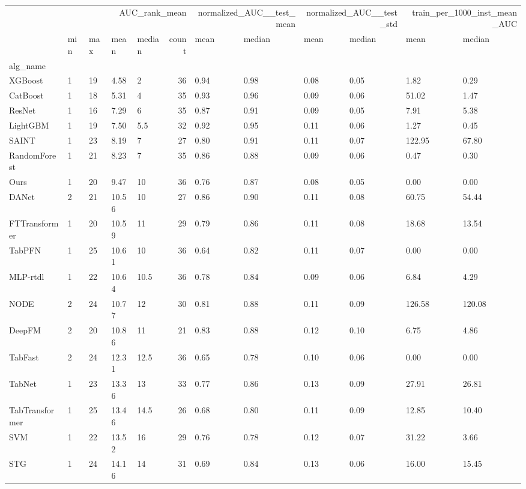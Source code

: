 \begin{tabular}{lllllrllllll}
\toprule
 & \multicolumn{5}{r}{AUC_rank_mean} & \multicolumn{2}{r}{normalized_AUC__test_mean} & \multicolumn{2}{r}{normalized_AUC__test_std} & \multicolumn{2}{r}{train_per_1000_inst_mean_AUC} \\
 & min & max & mean & median & count & mean & median & mean & median & mean & median \\
alg_name &  &  &  &  &  &  &  &  &  &  &  \\
\midrule
XGBoost & 1 & 19 & 4.58 & 2 & 36 & 0.94 & 0.98 & 0.08 & 0.05 & 1.82 & 0.29 \\
CatBoost & 1 & 18 & 5.31 & 4 & 35 & 0.93 & 0.96 & 0.09 & 0.06 & 51.02 & 1.47 \\
ResNet & 1 & 16 & 7.29 & 6 & 35 & 0.87 & 0.91 & 0.09 & 0.05 & 7.91 & 5.38 \\
LightGBM & 1 & 19 & 7.50 & 5.5 & 32 & 0.92 & 0.95 & 0.11 & 0.06 & 1.27 & 0.45 \\
SAINT & 1 & 23 & 8.19 & 7 & 27 & 0.80 & 0.91 & 0.11 & 0.07 & 122.95 & 67.80 \\
RandomForest & 1 & 21 & 8.23 & 7 & 35 & 0.86 & 0.88 & 0.09 & 0.06 & 0.47 & 0.30 \\
Ours & 1 & 20 & 9.47 & 10 & 36 & 0.76 & 0.87 & 0.08 & 0.05 & 0.00 & 0.00 \\
DANet & 2 & 21 & 10.56 & 10 & 27 & 0.86 & 0.90 & 0.11 & 0.08 & 60.75 & 54.44 \\
FTTransformer & 1 & 20 & 10.59 & 11 & 29 & 0.79 & 0.86 & 0.11 & 0.08 & 18.68 & 13.54 \\
TabPFN & 1 & 25 & 10.61 & 10 & 36 & 0.64 & 0.82 & 0.11 & 0.07 & 0.00 & 0.00 \\
MLP-rtdl & 1 & 22 & 10.64 & 10.5 & 36 & 0.78 & 0.84 & 0.09 & 0.06 & 6.84 & 4.29 \\
NODE & 2 & 24 & 10.77 & 12 & 30 & 0.81 & 0.88 & 0.11 & 0.09 & 126.58 & 120.08 \\
DeepFM & 2 & 20 & 10.86 & 11 & 21 & 0.83 & 0.88 & 0.12 & 0.10 & 6.75 & 4.86 \\
TabFast & 2 & 24 & 12.31 & 12.5 & 36 & 0.65 & 0.78 & 0.10 & 0.06 & 0.00 & 0.00 \\
TabNet & 1 & 23 & 13.36 & 13 & 33 & 0.77 & 0.86 & 0.13 & 0.09 & 27.91 & 26.81 \\
TabTransformer & 1 & 25 & 13.46 & 14.5 & 26 & 0.68 & 0.80 & 0.11 & 0.09 & 12.85 & 10.40 \\
SVM & 1 & 22 & 13.52 & 16 & 29 & 0.76 & 0.78 & 0.12 & 0.07 & 31.22 & 3.66 \\
STG & 1 & 24 & 14.16 & 14 & 31 & 0.69 & 0.84 & 0.13 & 0.06 & 16.00 & 15.45 \\

\end{tabular}
